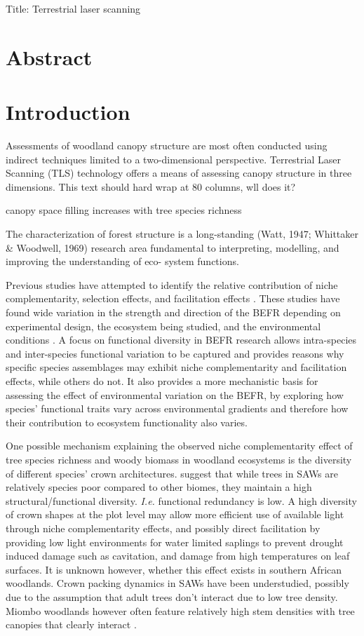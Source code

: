 \documentclass[11pt,a4paper]{article}
\newcommand{\titletext}{Terrestrial laser scanning}
\begin{document}
{\Large{Title: \titletext{}}}


\section*{Abstract}

\section{Introduction}

Assessments of woodland canopy structure are most often conducted using indirect
techniques limited to a two-dimensional perspective. Terrestrial Laser Scanning
(TLS) technology offers a means of assessing canopy structure in three
dimensions. This text should hard wrap at 80 columns, wll does it?

 canopy space filling increases with tree species richness

The characterization of forest structure is a long-standing (Watt, 1947; Whittaker & Woodwell, 1969) research area fundamental to interpreting, modelling, and improving the understanding of eco- system functions. 

Previous studies have attempted to identify the relative contribution of niche complementarity, selection effects, and facilitation effects \citep{Scherer-Lorenzen2014}. These studies have found wide variation in the strength and direction of the BEFR depending on experimental design, the ecosystem being studied, and the environmental conditions \citep{Vila2005}. A focus on functional diversity in BEFR research allows intra-species and inter-species functional variation to be captured and provides reasons why specific species assemblages may exhibit niche complementarity and facilitation effects, while others do not. It also provides a more mechanistic basis for assessing the effect of environmental variation on the BEFR, by exploring how species' functional traits vary across environmental gradients and therefore how their contribution to ecosystem functionality also varies. 

One possible mechanism explaining the observed niche complementarity effect of tree species richness and woody biomass in woodland ecosystems is the diversity of different species' crown architectures. \citet{Solbrig1996} suggest that while trees in SAWs are relatively species poor compared to other biomes, they maintain a high structural/functional diversity. \textit{I.e.} functional redundancy is low. A high diversity of crown shapes at the plot level may allow more efficient use of available light through niche complementarity effects, and possibly direct facilitation by providing low light environments for water limited saplings to prevent drought induced damage such as cavitation, and damage from high temperatures on leaf surfaces. It is unknown however, whether this effect exists in southern African woodlands. Crown packing dynamics in SAWs have been understudied, possibly due to the assumption that adult trees don't interact due to low tree density. Miombo woodlands however often feature relatively high stem densities with tree canopies that clearly interact \citep{Campbell2002}.
\end{document}
